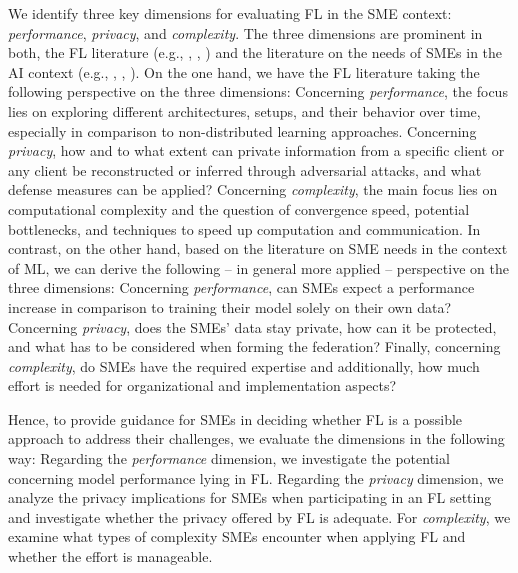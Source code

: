 %

We identify three key dimensions for evaluating FL in the SME context: \emph{performance}, \emph{privacy}, and \emph{complexity}. The three dimensions are prominent in both, the FL literature (e.g., \citet{mcmahan2017communication}, \citet{konevcny2016federated}, \citet{yang2019federated}) and the literature on the needs of SMEs in the AI context (e.g., \citet{hbr2021midsizeAI}, \citet{bmwi2020mittelstand}, \citet{eco2021kmu}). On the one hand, we have the FL literature taking the following perspective on the three dimensions: Concerning \emph{performance}, the focus lies on exploring different architectures, setups, and their behavior over time, especially in comparison to non-distributed learning approaches. Concerning \emph{privacy}, how and to what extent can private information from a specific client or any client be reconstructed or inferred through adversarial attacks, and what defense measures can be applied? Concerning \emph{complexity}, the main focus lies on computational complexity and the question of convergence speed, potential bottlenecks, and techniques to speed up computation and communication. In contrast, on the other hand, based on the literature on SME needs in the context of ML, we can derive the following -- in general more applied -- perspective on the three dimensions: Concerning \emph{performance}, can SMEs expect a performance increase in comparison to training their model solely on their own data? Concerning \emph{privacy}, does the SMEs' data stay private, how can it be protected, and what has to be considered when forming the federation? Finally, concerning \emph{complexity}, do SMEs have the required expertise and additionally, how much effort is needed for organizational and implementation aspects?

Hence, to provide guidance for SMEs in deciding whether FL is a possible approach to address their challenges, we evaluate the dimensions in the following way:
Regarding the \emph{performance} dimension, we investigate the potential concerning model performance lying in FL. %
Regarding the \emph{privacy} dimension, we analyze the privacy implications for SMEs when participating in an FL setting and investigate whether the privacy offered by FL is adequate. For \emph{complexity}, we examine what types of complexity SMEs encounter when applying FL and whether the effort is manageable.

